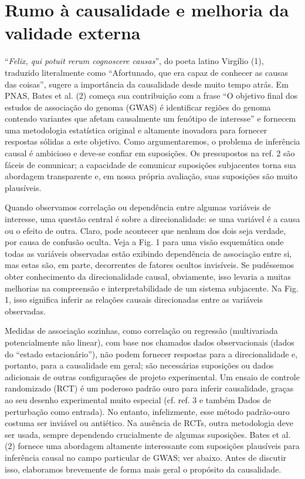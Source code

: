 
\section*{Rumo à causalidade e melhoria da validade externa}


    ``\textit{Felix, qui potuit rerum cognoscere causas}'', do poeta latino Virgílio (1), traduzido literalmente como ``Afortunado, que era capaz de conhecer as causas das coisas'', sugere a importância da causalidade desde muito tempo atrás. Em PNAS, Bates et al. (2) começa sua contribuição com a frase ``O objetivo final dos estudos de associação do genoma (GWAS) é identificar regiões do genoma contendo variantes que afetam causalmente um fenótipo de interesse'' e fornecem uma metodologia estatística original e altamente inovadora para fornecer respostas sólidas a este objetivo. Como argumentaremos, o problema de inferência causal é ambicioso e deve-se confiar em suposições. Os pressupostos na ref. 2 são fáceis de comunicar; a capacidade de comunicar suposições subjacentes torna sua abordagem transparente e, em nossa própria avaliação, suas suposições são muito plausíveis.

    Quando observamos correlação ou dependência entre algumas variáveis de interesse, uma questão central é sobre a direcionalidade: se uma variável é a causa ou o efeito de outra. Claro, pode acontecer que nenhum dos dois seja verdade, por causa de confusão oculta. Veja a Fig. 1 para uma visão esquemática onde todas as variáveis observadas estão exibindo dependência de associação entre si, mas estas são, em parte, decorrentes de fatores ocultos invisíveis. Se pudéssemos obter conhecimento da direcionalidade causal, obviamente, isso levaria a muitas melhorias na compreensão e interpretabilidade de um sistema subjacente. Na Fig. 1, isso significa inferir as relações causais direcionadas entre as variáveis observadas.


    Medidas de associação sozinhas, como correlação ou regressão (multivariada potencialmente não linear), com base nos chamados dados observacionais (dados do ``estado estacionário''), não podem fornecer respostas para a direcionalidade e, portanto, para a causalidade em geral; são necessárias suposições ou dados adicionais de outras configurações de projeto experimental. Um ensaio de controle randomizado (RCT) é um poderoso padrão ouro para inferir causalidade, graças ao seu desenho experimental muito especial (cf. ref. 3 e também Dados de perturbação como entrada). No entanto, infelizmente, esse método padrão-ouro costuma ser inviável ou antiético. Na ausência de RCTs, outra metodologia deve ser usada, sempre dependendo crucialmente de algumas suposições. Bates et al. (2) fornece uma abordagem altamente interessante com suposições plausíveis para inferência causal no campo particular de GWAS; ver abaixo. Antes de discutir isso, elaboramos brevemente de forma mais geral o propósito da causalidade.

